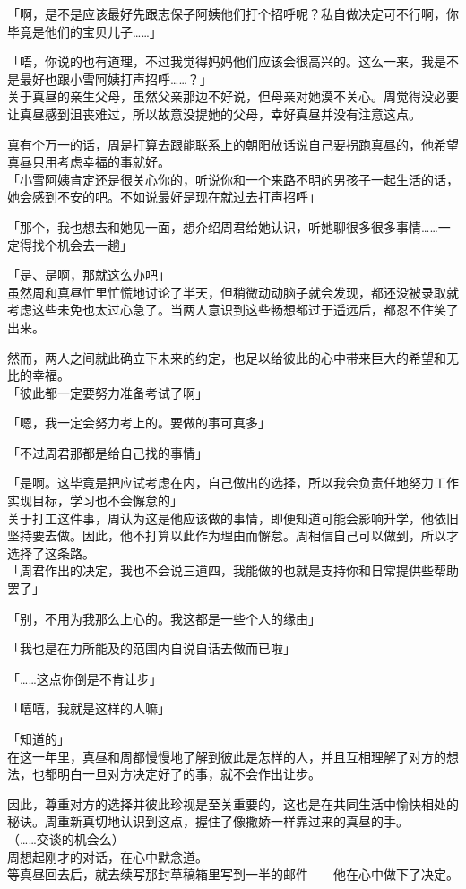 「啊，是不是应该最好先跟志保子阿姨他们打个招呼呢？私自做决定可不行啊，你毕竟是他们的宝贝儿子……」

「唔，你说的也有道理，不过我觉得妈妈他们应该会很高兴的。这么一来，我是不是最好也跟小雪阿姨打声招呼……？」\\

关于真昼的亲生父母，虽然父亲那边不好说，但母亲对她漠不关心。周觉得没必要让真昼感到沮丧难过，所以故意没提她的父母，幸好真昼并没有注意这点。

真有个万一的话，周是打算去跟能联系上的朝阳放话说自己要拐跑真昼的，他希望真昼只用考虑幸福的事就好。\\

「小雪阿姨肯定还是很关心你的，听说你和一个来路不明的男孩子一起生活的话，她会感到不安的吧。不如说最好是现在就过去打声招呼」

「那个，我也想去和她见一面，想介绍周君给她认识，听她聊很多很多事情……一定得找个机会去一趟」

「是、是啊，那就这么办吧」\\

虽然周和真昼忙里忙慌地讨论了半天，但稍微动动脑子就会发现，都还没被录取就考虑这些未免也太过心急了。当两人意识到这些畅想都过于遥远后，都忍不住笑了出来。

然而，两人之间就此确立下未来的约定，也足以给彼此的心中带来巨大的希望和无比的幸福。\\

「彼此都一定要努力准备考试了啊」

「嗯，我一定会努力考上的。要做的事可真多」

「不过周君那都是给自己找的事情」

「是啊。这毕竟是把应试考虑在内，自己做出的选择，所以我会负责任地努力工作实现目标，学习也不会懈怠的」\\

关于打工这件事，周认为这是他应该做的事情，即便知道可能会影响升学，他依旧坚持要去做。因此，他不打算以此作为理由而懈怠。周相信自己可以做到，所以才选择了这条路。\\

「周君作出的决定，我也不会说三道四，我能做的也就是支持你和日常提供些帮助罢了」

「别，不用为我那么上心的。我这都是一些个人的缘由」

「我也是在力所能及的范围内自说自话去做而已啦」

「……这点你倒是不肯让步」

「嘻嘻，我就是这样的人嘛」

「知道的」\\

在这一年里，真昼和周都慢慢地了解到彼此是怎样的人，并且互相理解了对方的想法，也都明白一旦对方决定好了的事，就不会作出让步。

因此，尊重对方的选择并彼此珍视是至关重要的，这也是在共同生活中愉快相处的秘诀。周重新真切地认识到这点，握住了像撒娇一样靠过来的真昼的手。\\

（……交谈的机会么）\\

周想起刚才的对话，在心中默念道。\\

等真昼回去后，就去续写那封草稿箱里写到一半的邮件——他在心中做下了决定。
